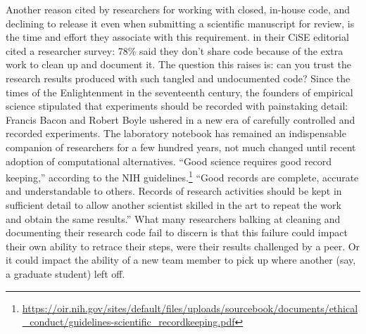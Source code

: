 \documentclass{statement}
\newlength{\up}
\begin{document}
Another reason cited by researchers for working with closed, in-house code, and declining to release it even when submitting a scientific manuscript for review, is the time and effort they associate with this requirement. 
\cite{leveque2012} in their CiSE editorial cited a researcher survey: 78\% said they don't share code because of the extra work to clean up and document it. 
The question this raises is: can you trust the research results produced with such tangled and undocumented code? 
Since the times of the Enlightenment in the seventeenth century, the founders of empirical science stipulated that experiments should be recorded with painstaking detail: 
Francis Bacon and Robert Boyle ushered in a new era of carefully controlled and recorded experiments. 
The laboratory notebook has remained an indispensable companion of researchers for a few hundred years, not much changed until recent adoption of computational alternatives. 
``Good science requires good record keeping,'' according to the NIH guidelines.\footnote{\url{https://oir.nih.gov/sites/default/files/uploads/sourcebook/documents/ethical_conduct/guidelines-scientific_recordkeeping.pdf} } 
``Good records are complete, accurate and understandable to others. 
Records of research activities should be kept in sufficient detail to allow another scientist skilled in the art to repeat the work and obtain the same results.'' 
What many researchers balking at cleaning and documenting their research code fail to discern is that this failure could impact their own ability to retrace their steps, were their results challenged by a peer. 
Or it could impact the ability of a new team member to pick up where another (say, a graduate student) left off. 
\end{document}
